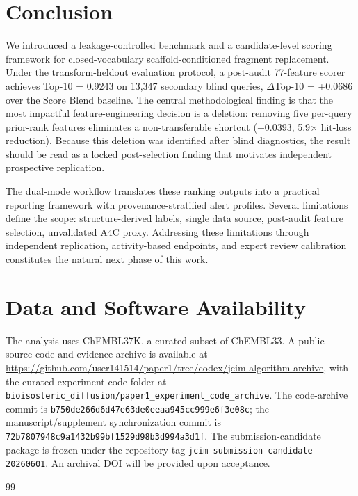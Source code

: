 \documentclass[12pt,letterpaper]{article}
\begin{document}
\section{Conclusion}

We introduced a leakage-controlled benchmark and a candidate-level scoring framework for closed-vocabulary scaffold-conditioned fragment replacement. Under the transform-heldout evaluation protocol, a post-audit 77-feature scorer achieves Top-10 = 0.9243 on 13,347 secondary blind queries, $\Delta$Top-10 = +0.0686 over the Score Blend baseline. The central methodological finding is that the most impactful feature-engineering decision is a deletion: removing five per-query prior-rank features eliminates a non-transferable shortcut (+0.0393, 5.9$\times$ hit-loss reduction). Because this deletion was identified after blind diagnostics, the result should be read as a locked post-selection finding that motivates independent prospective replication.

The dual-mode workflow translates these ranking outputs into a practical reporting framework with provenance-stratified alert profiles. Several limitations define the scope: structure-derived labels, single data source, post-audit feature selection, unvalidated A4C proxy. Addressing these limitations through independent replication, activity-based endpoints, and expert review calibration constitutes the natural next phase of this work.


\section*{Data and Software Availability}

The analysis uses ChEMBL37K, a curated subset of ChEMBL33. A public source-code and evidence archive is available at \url{https://github.com/user141514/paper1/tree/codex/jcim-algorithm-archive}, with the curated experiment-code folder at \texttt{bioisosteric\_diffusion/paper1\_experiment\_code\_archive}. The code-archive commit is \texttt{b750de266d6d47e63de0eeaa945cc999e6f3e08c}; the manuscript/supplement synchronization commit is \texttt{72b7807948c9a1432b99bf1529d98b3d994a3d1f}. The submission-candidate package is frozen under the repository tag \texttt{jcim-submission-candidate-20260601}. An archival DOI will be provided upon acceptance.


\begin{thebibliography}{99}



\end{thebibliography}
\end{document}
